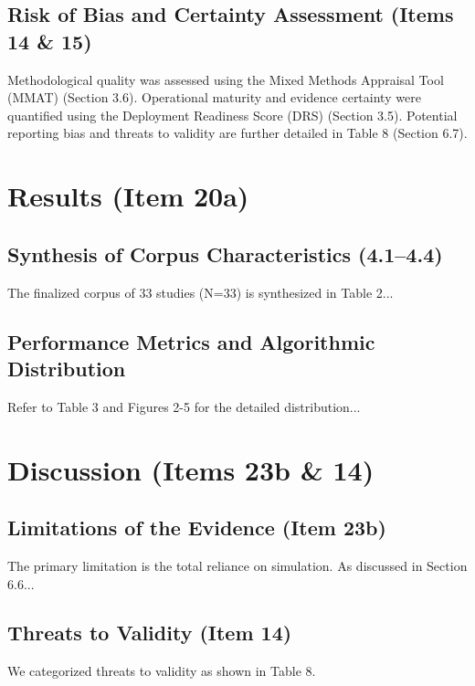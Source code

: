 \documentclass[review,3p,times]{elsarticle}
\begin{document}
\subsection{Risk of Bias and Certainty Assessment (Items 14 \& 15)}
\label{sec:bias_certainty}
Methodological quality was assessed using the Mixed Methods Appraisal Tool (MMAT) (Section 3.6). Operational maturity and evidence certainty were quantified using the Deployment Readiness Score (DRS) (Section 3.5). Potential reporting bias and threats to validity are further detailed in Table 8 (Section 6.7).

\section{Results (Item 20a)}
\subsection{Synthesis of Corpus Characteristics (4.1--4.4)}
The finalized corpus of 33 studies (N=33) is synthesized in Table 2...

\subsection{Performance Metrics and Algorithmic Distribution}
Refer to Table 3 and Figures 2-5 for the detailed distribution...

\section{Discussion (Items 23b \& 14)}
\subsection{Limitations of the Evidence (Item 23b)}
\label{sec:limitations}
The primary limitation is the total reliance on simulation. As discussed in Section 6.6...

\subsection{Threats to Validity (Item 14)}
\label{sec:threats_validity}
We categorized threats to validity as shown in Table 8.
\end{document}
